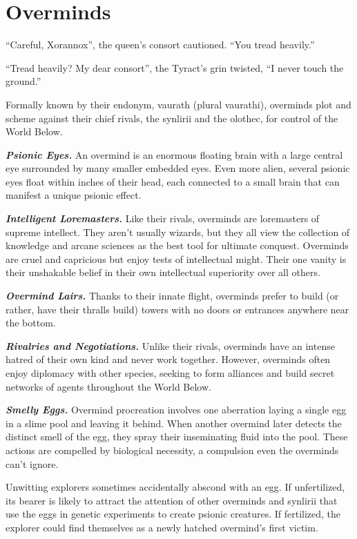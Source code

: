 \documentclass[10pt,a4paper,twoside,fancy,bg=print,twocolumn,openany,nodeprecatedcode]{dndbook}
\begin{document}
\chapter*{Overminds}

\begin{DndReadAloud}
\enquote{Careful, Xorannox}, the queen's consort cautioned. \enquote{You tread heavily.}

\enquote{Tread heavily? My dear consort}, the Tyract's grin twisted, \enquote{I never touch the ground.}
\end{DndReadAloud}

Formally known by their endonym, vaurath (plural vaurathi), overminds plot and scheme against their chief rivals, the synlirii and the olothec, for control of the World Below.

\textbf{\textit{Psionic Eyes.}} An overmind is an enormous floating brain with a large central eye surrounded by many smaller embedded eyes. Even more alien, several psionic eyes float within inches of their head, each connected to a small brain that can manifest a unique psionic effect.

\textbf{\textit{Intelligent Loremasters.}} Like their rivals, overminds are loremasters of supreme intellect. They aren't usually wizards, but they all view the collection of knowledge and arcane sciences as the best tool for ultimate conquest. Overminds are cruel and capricious but enjoy tests of intellectual might. Their one vanity is their unshakable belief in their own intellectual superiority over all others.

\textbf{\textit{Overmind Lairs.}} Thanks to their innate flight, overminds prefer to build (or rather, have their thralls build) towers with no doors or entrances anywhere near the bottom.

\textbf{\textit{Rivalries and Negotiations.}} Unlike their rivals, overminds have an intense hatred of their own kind and never work together. However, overminds often enjoy diplomacy with other species, seeking to form alliances and build secret networks of agents throughout the World Below.

\textbf{\textit{Smelly Eggs.}} Overmind procreation involves one aberration laying a single egg in a slime pool and leaving it behind. When another overmind later detects the distinct smell of the egg, they spray their inseminating fluid into the pool. These actions are compelled by biological necessity, a compulsion even the overminds can't ignore.

Unwitting explorers sometimes accidentally abscond with an egg. If unfertilized, its bearer is likely to attract the attention of other overminds and synlirii that use the eggs in genetic experiments to create psionic creatures. If fertilized, the explorer could find themselves as a newly hatched overmind's first victim.
\end{document}
